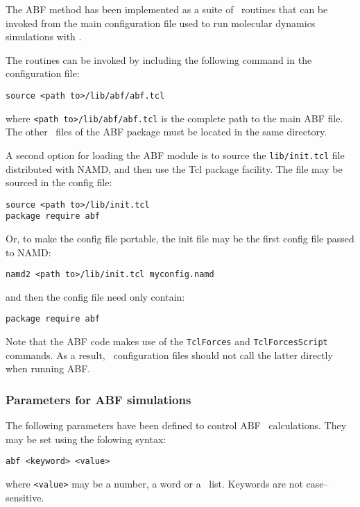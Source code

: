 The ABF method has been implemented as a suite of \tcl \
routines that can be invoked from the main configuration file used
to run molecular dynamics simulations with \namd.

The routines can be invoked by including the following
command in the configuration file:

\begin{verbatim}
source <path to>/lib/abf/abf.tcl
\end{verbatim}

where \texttt{<path to>/lib/abf/abf.tcl} is the complete path to
the main ABF file. The other \tcl\ files of the ABF
package must be located in the same directory.

A second option for loading the ABF module is to source the
\texttt{lib/init.tcl} file distributed with NAMD, and then use the
Tcl package facility.  The file may be sourced in the config file:

\begin{verbatim}
source <path to>/lib/init.tcl
package require abf
\end{verbatim}

Or, to make the config file portable, the init file may be the
first config file passed to NAMD:

\begin{verbatim}
namd2 <path to>/lib/init.tcl myconfig.namd
\end{verbatim}

and then the config file need only contain:

\begin{verbatim}
package require abf
\end{verbatim}

Note that the ABF code makes use of the {\tt TclForces} and
{\tt TclForcesScript} commands.
As a result, \namd\ configuration files
should not call the latter directly when running ABF.



\subsubsection{Parameters for ABF simulations}


The following parameters have been defined to control ABF \
calculations. They may be set using the folowing syntax:

{\tt abf <keyword> <value>}

where {\tt <value>} may be a number, a word or a \tcl\ list.
Keywords are not case--sensitive.



